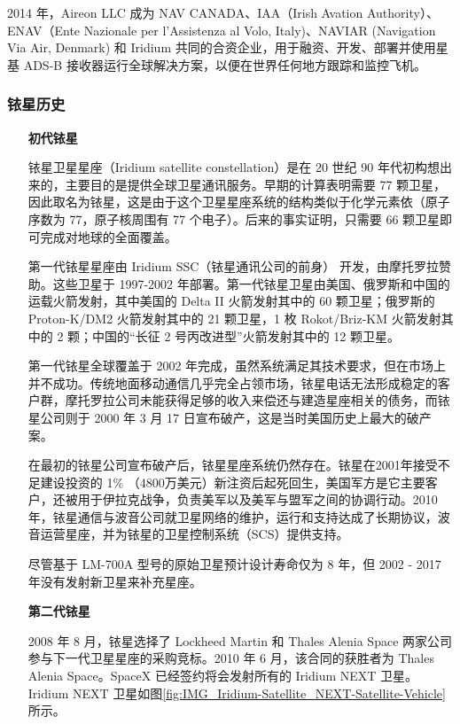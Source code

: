 2014 年，Aireon LLC 成为 NAV CANADA、IAA（Irish Avation Authority）、ENAV（Ente Nazionale per l'Assistenza al Volo, Italy)、NAVIAR (Navigation Via Air, Denmark) 和 Iridium 共同的合资企业，用于融资、开发、部署并使用星基 ADS-B 接收器运行全球解决方案，以便在世界任何地方跟踪和监控飞机。

\subsubsection{铱星历史}

\begin{enumerate}
    \item[\textbf{初代铱星}]

    铱星卫星星座（Iridium satellite constellation）是在 20 世纪 90 年代初构想出来的，主要目的是提供全球卫星通讯服务。早期的计算表明需要 77 颗卫星，因此取名为铱星，这是由于这个卫星星座系统的结构类似于化学元素依（原子序数为 77，原子核周围有 77 个电子）。后来的事实证明，只需要 66 颗卫星即可完成对地球的全面覆盖。

    第一代铱星星座由 Iridium SSC（铱星通讯公司的前身） 开发，由摩托罗拉赞助。这些卫星于 1997-2002 年部署。第一代铱星卫星由美国、俄罗斯和中国的运载火箭发射，其中美国的 Delta II 火箭发射其中的 60 颗卫星；俄罗斯的 Proton-K/DM2 火箭发射其中的 21 颗卫星，1 枚 Rokot/Briz-KM 火箭发射其中的 2 颗；中国的“长征 2 号丙改进型”火箭发射其中的 12 颗卫星。

    第一代铱星全球覆盖于 2002 年完成，虽然系统满足其技术要求，但在市场上并不成功。传统地面移动通信几乎完全占领市场，铱星电话无法形成稳定的客户群，摩托罗拉公司未能获得足够的收入来偿还与建造星座相关的债务，而铱星公司则于 2000 年 3 月 17 日宣布破产，这是当时美国历史上最大的破产案。

    在最初的铱星公司宣布破产后，铱星星座系统仍然存在。铱星在2001年接受不足建设投资的 1\% （4800万美元）新注资后起死回生，美国军方是它主要客户，还被用于伊拉克战争，负责美军以及美军与盟军之间的协调行动。2010年，铱星通信与波音公司就卫星网络的维护，运行和支持达成了长期协议，波音运营星座，并为铱星的卫星控制系统（SCS）提供支持。

    尽管基于 LM-700A 型号的原始卫星预计设计寿命仅为 8 年，但 2002 - 2017 年没有发射新卫星来补充星座。

    \item[\textbf{第二代铱星}]

    2008 年 8 月，铱星选择了 Lockheed Martin 和 Thales Alenia Space 两家公司参与下一代卫星星座的采购竞标。2010 年 6 月，该合同的获胜者为 Thales Alenia Space。SpaceX 已经签约将会发射所有的 Iridium NEXT 卫星。Iridium NEXT 卫星如图\ref{fig:IMG_Iridium-Satellite_NEXT-Satellite-Vehicle}所示。


\end{enumerate}

